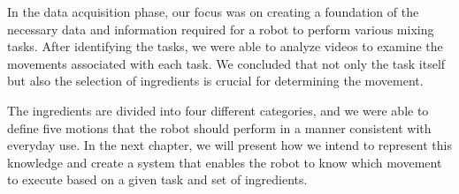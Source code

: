 In the data acquisition phase, our focus was on creating a foundation of the necessary data and information required for a robot to perform various mixing tasks. After identifying the tasks, we were able to analyze videos to examine the movements associated with each task. We concluded that not only the task itself but also the selection of ingredients is crucial for determining the movement.

The ingredients are divided into four different categories, and we were able to define five motions that the robot should perform in a manner consistent with everyday use. In the next chapter, we will present how we intend to represent this knowledge and create a system that enables the robot to know which movement to execute based on a given task and set of ingredients.
\newpage